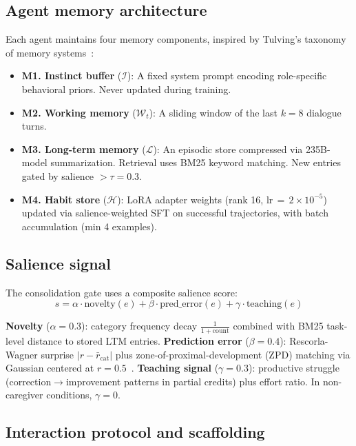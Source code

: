 \documentclass{article}
\begin{document}
\subsection{Agent memory architecture}

Each agent maintains four memory components, inspired by Tulving's taxonomy of memory systems~\citep{tulving1985memory}:

\begin{itemize}[leftmargin=*,itemsep=1pt]
    \item \textbf{M1. Instinct buffer} ($\mathcal{I}$): A fixed system prompt encoding role-specific behavioral priors. Never updated during training.
    \item \textbf{M2. Working memory} ($\mathcal{W}_t$): A sliding window of the last $k{=}8$ dialogue turns.
    \item \textbf{M3. Long-term memory} ($\mathcal{L}$): An episodic store compressed via 235B-model summarization. Retrieval uses BM25 keyword matching. New entries gated by salience $> \tau = 0.3$.
    \item \textbf{M4. Habit store} ($\mathcal{H}$): LoRA adapter weights (rank 16, lr$\,{=}\,2{\times}10^{-5}$) updated via salience-weighted SFT on successful trajectories, with batch accumulation (min 4 examples).
\end{itemize}

\subsection{Salience signal}

The consolidation gate uses a composite salience score:
\[
s = \alpha \cdot \text{novelty}(e) + \beta \cdot \text{pred\_error}(e) + \gamma \cdot \text{teaching}(e)
\]

\textbf{Novelty} ($\alpha{=}0.3$): category frequency decay $\frac{1}{1+\text{count}}$ combined with BM25 task-level distance to stored LTM entries. \textbf{Prediction error} ($\beta{=}0.4$): Rescorla-Wagner surprise $|r - \bar{r}_\text{cat}|$ plus zone-of-proximal-development (ZPD) matching via Gaussian centered at $r{=}0.5$~\citep{wood1976role}. \textbf{Teaching signal} ($\gamma{=}0.3$): productive struggle (correction$\to$improvement patterns in partial credits) plus effort ratio. In non-caregiver conditions, $\gamma = 0$.

\subsection{Interaction protocol and scaffolding}
\end{document}
